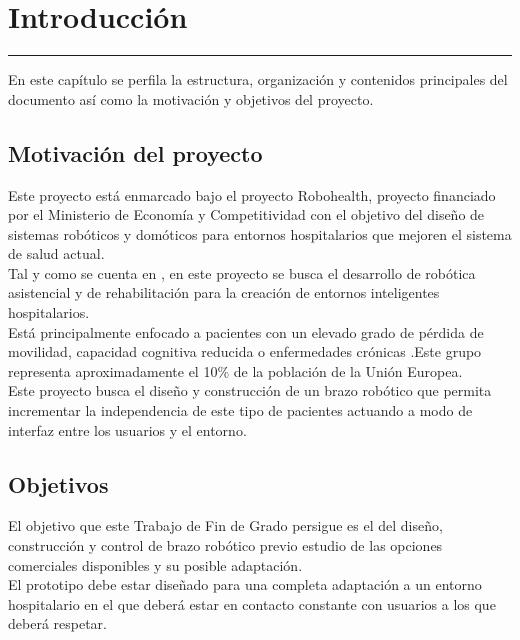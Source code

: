 \chapter{Introducción} \label{chap:Introduccion}
\hrule
\vspace{3mm}

En este capítulo se perfila la estructura, organización y contenidos principales del documento así como la motivación y objetivos del proyecto.


\section{Motivación del proyecto}

Este proyecto está enmarcado bajo el proyecto Robohealth, proyecto financiado por el Ministerio de Economía y Competitividad con el objetivo del diseño de sistemas robóticos y domóticos para entornos hospitalarios que mejoren el sistema de salud actual.
\\

Tal y como se cuenta en \cite{robohealth}, en este proyecto se busca el desarrollo de robótica asistencial y de rehabilitación para la creación de entornos inteligentes hospitalarios.
\\

Está principalmente enfocado a pacientes con un elevado grado de pérdida de movilidad, capacidad cognitiva reducida o enfermedades crónicas .Este grupo representa aproximadamente el 10\% de la población de la Unión Europea.
\\

Este proyecto busca el diseño y construcción de un brazo robótico que permita incrementar la independencia de este tipo de pacientes actuando a modo de interfaz entre los usuarios y el entorno.
\section{Objetivos}

El objetivo que este Trabajo de Fin de Grado persigue es el del diseño, construcción y control de brazo robótico previo estudio de las opciones comerciales disponibles y su posible adaptación. 
\\

El  prototipo debe estar diseñado para una completa adaptación a un entorno hospitalario en el que deberá estar en contacto constante con usuarios a los que deberá respetar.
\\


